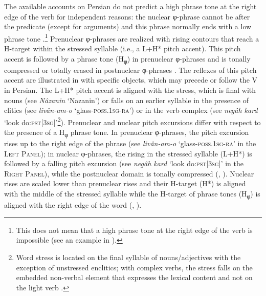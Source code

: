 \documentclass[output=paper,colorlinks,citecolor=brown]{langscibook}
\begin{document}
The available accounts on Persian  do not predict a high phrase tone at the right edge of the verb for independent reasons: the nuclear φ-phrase cannot be after the predicate (except for  arguments) and this phrase normally ends with a low phrase tone \citep[9, 68]{sadat-tehrani_intonational_2007}.\footnote{This does not mean that a high phrase tone at the right edge of the verb is impossible (see an example in \citealt[54]{Mahjani2003}).} Prenuclear φ-phrases are realized with rising contours that reach a H-target within the stressed syllable (i.e., a L+H* pitch accent). This pitch accent is followed by a phrase tone (H\textsubscript{φ}) in prenuclear φ-phrases \citep[9, 42, 68]{sadat-tehrani_intonational_2007} and is tonally compressed or totally erased in postnuclear φ-phrases \citep[]{abolhasanizadeh_persian_2012}. The reflexes of this pitch accent are illustrated in  with specific objects, which may precede or follow the V in Persian. The L+H* pitch accent is aligned with the stress, which is final with nouns (see \textit{Nâza\textquotesingle nin} `Nazanin') or falls on an earlier syllable in the presence of clitics (see \textit{li\textquotesingle vân-am-o} `glass-\textsc{poss.1sg-ra}') or in the verb complex (see \textit{ne\textquotesingle gâh kard} `look do:\textsc{pst}[\textsc{3sg}]'\footnote{Word
    stress is located on the final syllable of nouns/adjectives with the exception of unstressed enclitics; with complex verbs, the stress falls on the embedded non-verbal element that expresses the lexical content and not on the light verb \citep[]{kahnemuyipour_syntactic_2003}.
}). Prenuclear and nuclear pitch excursions differ with respect to the presence of a H\textsubscript{φ} phrase tone. In prenuclear φ-phrases, the pitch excursion rises up to the right edge of the phrase (see \textit{li\textquotesingle vân-am-o} `glass-\textsc{poss.1sg-ra}' in  the \textsc{Left Panel}); in nuclear φ-phrases, the rising in the stressed syllable (L+H*) is followed by a falling pitch excursion (see \textit{ne\textquotesingle gâh kard} `look do:\textsc{pst}[\textsc{3sg}]' in  the \textsc{Right Panel}), while the postnuclear domain is tonally compressed (\citealt[7--8]{sadat-tehrani_intonational_2007}{}, \citealt[]{taheri_ardali_phonetic_2012}{}). Nuclear rises are scaled lower than prenuclear rises and their H-target (H*) is aligned with the middle of the stressed syllable while the H-target of phrase tones (H\textsubscript{φ}) is aligned with the right edge of the word (\citealt[]{sadat-tehrani_alignment_2009}{}, \citealt[104--107]{hosseini_phonology_2014}{}).
\end{document}
